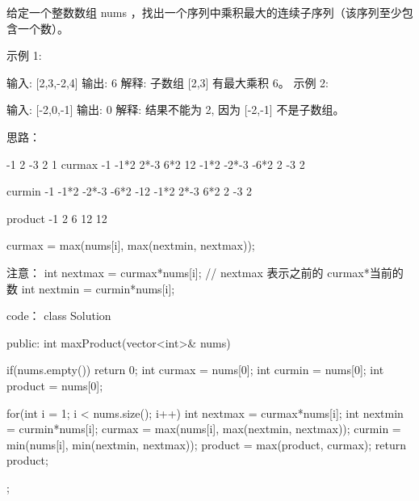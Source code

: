给定一个整数数组 nums ，找出一个序列中乘积最大的连续子序列（该序列至少包含一个数）。

示例 1:

输入: [2,3,-2,4]
输出: 6
解释: 子数组 [2,3] 有最大乘积 6。
示例 2:

输入: [-2,0,-1]
输出: 0
解释: 结果不能为 2, 因为 [-2,-1] 不是子数组。





























思路：

				-1		2		-3		2		1
curmax			-1	   -1*2	    2*-3	    6*2		12
					   -1*2       -2*-3      -6*2		
					     2		-3		2

curmin			-1	   -1*2	   -2*-3	    -6*2		-12
					   -1*2	   2*-3	    6*2
						2	    -3         2

product 			-1		2		6		12		12

curmax = max(nums[i], max(nextmin, nextmax));




注意：
 int nextmax = curmax*nums[i];  // nextmax 表示之前的 curmax*当前的数
 int nextmin = curmin*nums[i];
























code：
class Solution {
public:
    int maxProduct(vector<int>& nums) {
        if(nums.empty()) return 0;
        int curmax = nums[0];
        int curmin = nums[0];
        int product = nums[0];
        
        for(int i = 1; i < nums.size(); i++)
        {
            int nextmax = curmax*nums[i];
            int nextmin = curmin*nums[i];
            curmax = max(nums[i], max(nextmin, nextmax));
            curmin = min(nums[i], min(nextmin, nextmax));
            product = max(product, curmax);
        }
        return product;
    }
};